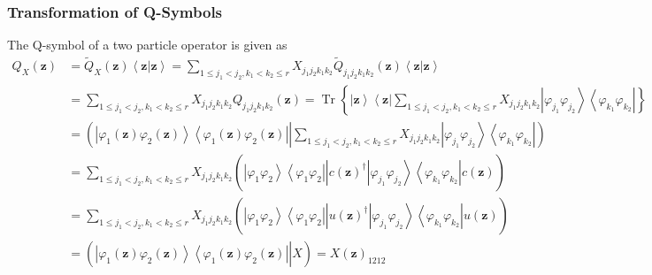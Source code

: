 \documentclass[aps,preprint]{revtex4}%
\begin{document}
\subsubsection{Transformation of Q-Symbols}

The Q-symbol of a two particle operator is given as
\begin{align}
Q_{X}\left(  \mathbf{z}\right)   &  =\tilde{Q}_{X}\left(  \mathbf{z}\right)
\left\langle \mathbf{z}\left\vert \mathbf{z}\right.  \right\rangle
=\sum_{1\leq j_{1}<j_{2},k_{1}<k_{2}\leq r}X_{j_{1}j_{2}k_{1}k_{2}}\tilde
{Q}_{j_{1}j_{2}k_{1}k_{2}}\left(  \mathbf{z}\right)  \left\langle
\mathbf{z}\left\vert \mathbf{z}\right.  \right\rangle \nonumber\\
&  =\sum_{1\leq j_{1}<j_{2},k_{1}<k_{2}\leq r}X_{j_{1}j_{2}k_{1}k_{2}}%
Q_{j_{1}j_{2}k_{1}k_{2}}\left(  \mathbf{z}\right)  =\operatorname*{Tr}\left\{
\left\vert \mathbf{z}\right\rangle \left\langle \mathbf{z}\right\vert
\sum_{1\leq j_{1}<j_{2},k_{1}<k_{2}\leq r}X_{j_{1}j_{2}k_{1}k_{2}}\left\vert
\varphi_{j_{1}}\varphi_{j_{2}}\right\rangle \left\langle \varphi_{k_{1}%
}\varphi_{k_{2}}\right\vert \right\}  \nonumber\\
&  =\left(  \left.  \overset{}{\left\vert \varphi_{1}\left(  \mathbf{z}%
\right)  \varphi_{2}\left(  \mathbf{z}\right)  \right\rangle \left\langle
\varphi_{1}\left(  \mathbf{z}\right)  \varphi_{2}\left(  \mathbf{z}\right)
\right\vert }\right\vert \sum_{1\leq j_{1}<j_{2},k_{1}<k_{2}\leq r}%
X_{j_{1}j_{2}k_{1}k_{2}}\left\vert \varphi_{j_{1}}\varphi_{j_{2}}\right\rangle
\left\langle \varphi_{k_{1}}\varphi_{k_{2}}\right\vert \right)  \nonumber\\
&  =\sum_{1\leq j_{1}<j_{2},k_{1}<k_{2}\leq r}X_{j_{1}j_{2}k_{1}k_{2}}\left(
\left.  \overset{}{\left\vert \varphi_{1}\varphi_{2}\right\rangle \left\langle
\varphi_{1}\varphi_{2}\right\vert }\right\vert \overset{}{c\left(
\mathbf{z}\right)  ^{\dagger}\left\vert \varphi_{j_{1}}\varphi_{j_{2}%
}\right\rangle \left\langle \varphi_{k_{1}}\varphi_{k_{2}}\right\vert
}c\left(  \mathbf{z}\right)  \right)  \nonumber\\
&  =\sum_{1\leq j_{1}<j_{2},k_{1}<k_{2}\leq r}X_{j_{1}j_{2}k_{1}k_{2}}\left(
\left.  \overset{}{\left\vert \varphi_{1}\varphi_{2}\right\rangle \left\langle
\varphi_{1}\varphi_{2}\right\vert }\right\vert \overset{}{u\left(
\mathbf{z}\right)  ^{\dagger}\left\vert \varphi_{j_{1}}\varphi_{j_{2}%
}\right\rangle \left\langle \varphi_{k_{1}}\varphi_{k_{2}}\right\vert
}u\left(  \mathbf{z}\right)  \right)  \nonumber\\
&  =\left(  \left.  \overset{}{\left\vert \varphi_{1}\left(  \mathbf{z}%
\right)  \varphi_{2}\left(  \mathbf{z}\right)  \right\rangle \left\langle
\varphi_{1}\left(  \mathbf{z}\right)  \varphi_{2}\left(  \mathbf{z}\right)
\right\vert }\right\vert X\right)  =X\left(  \mathbf{z}\right)  _{1212}%
\end{align}
\end{document}
